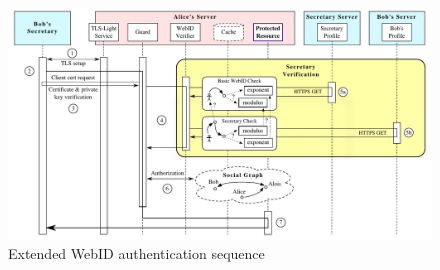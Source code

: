 \documentclass[a4paper]{llncs}
\begin{document}


\begin{figure}[htb]
  \centering
  \includegraphics[width=\textwidth]{AuthSequence}
  \caption{Extended WebID authentication sequence}
  \label{fig:AuthSequence}
\end{figure}

\end{document}
